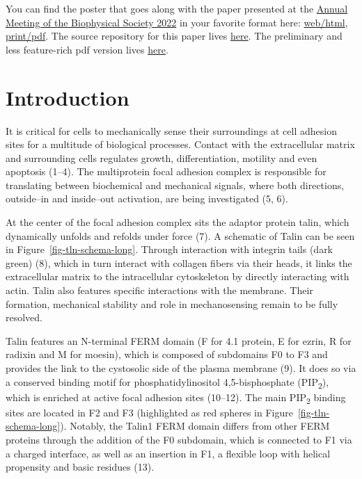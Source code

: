 \documentclass[
  letterpaper,
  DIV=11,
  numbers=noendperiod]{scrartcl}
\begin{document}
\begin{tcolorbox}[standard jigsaw,colframe=quarto-callout-tip-color-frame, title=\textcolor{quarto-callout-tip-color}{\faLightbulb}\hspace{0.5em}Tip, titlerule=0mm, bottomrule=.15mm, toprule=.15mm, toptitle=1mm, arc=.35mm, bottomtitle=1mm, rightrule=.15mm, leftrule=.75mm, left=2mm, colback=white, opacitybacktitle=0.6, coltitle=black, colbacktitle=quarto-callout-tip-color!10!white, opacityback=0]
You can find the poster that goes along with the paper presented at the
\href{https://www.biophysics.org/2022meeting\#}{Annual Meeting of the
Biophysical Society 2022} in your favorite format here:
\href{./poster.html}{web/html}, \href{./poster.pdf}{print/pdf}. The
source repository for this paper lives
\href{https://github.com/hits-mbm-dev/paper-talin-loop}{here}. The
preliminary and less feature-rich pdf version lives
\href{./index.pdf}{here}.
\end{tcolorbox}

\hypertarget{introduction}{%
\section{Introduction}\label{introduction}}

It is critical for cells to mechanically sense their surroundings at
cell adhesion sites for a multitude of biological processes. Contact
with the extracellular matrix and surrounding cells regulates growth,
differentiation, motility and even apoptosis (1--4). The multiprotein
focal adhesion complex is responsible for translating between
biochemical and mechanical signals, where both directions, outside--in
and inside--out activation, are being investigated (5, 6).

At the center of the focal adhesion complex sits the adaptor protein
talin, which dynamically unfolds and refolds under force (7). A
schematic of Talin can be seen in Figure~\ref{fig-tln-schema-long}.
Through interaction with integrin tails (dark green) (8), which in turn
interact with collagen fibers via their heads, it links the
extracellular matrix to the intracellular cytoskeleton by directly
interacting with actin. Talin also features specific interactions with
the membrane. Their formation, mechanical stability and role in
mechanosensing remain to be fully resolved.

Talin features an N-terminal FERM domain (F for 4.1 protein, E for
ezrin, R for radixin and M for moesin), which is composed of subdomains
F0 to F3 and provides the link to the cystosolic side of the plasma
membrane (9). It does so via a conserved binding motif for
phosphatidylinositol 4,5-bisphosphate (PIP\textsubscript{2}), which is
enriched at active focal adhesion sites (10--12). The main
PIP\textsubscript{2} binding sites are located in F2 and F3 (highlighted
as red spheres in Figure~\ref{fig-tln-schema-long}). Notably, the Talin1
FERM domain differs from other FERM proteins through the addition of the
F0 subdomain, which is connected to F1 via a charged interface, as well
as an insertion in F1, a flexible loop with helical propensity and basic
residues (13).
\end{document}
